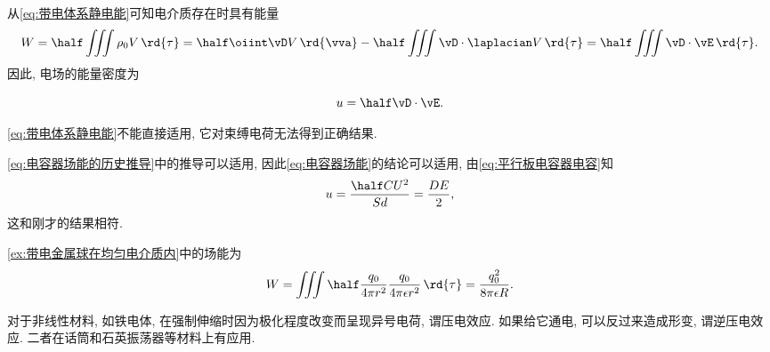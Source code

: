 \documentclass[../Electromagnetism.tex]{subfiles}
\begin{document}
从\eqref{eq:带电体系静电能}可知电介质存在时具有能量
\[ W = \half\iiint \rho_0 V\,\rd{\tau} = \half\oiint \vD V\,\rd{\vva} - \half \iiint \vD\cdot\laplacian V\,\rd{\tau} = \half\iiint \vD\cdot\vE \,\rd{\tau}. \]
因此, 电场的能量密度为
\begin{finale}
	\[ u = \half \vD\cdot\vE. \]
\end{finale}
\begin{pitfall}
	\eqref{eq:带电体系静电能}不能直接适用, 它对束缚电荷无法得到正确结果.
\end{pitfall}
\begin{ex}
	\eqref{eq:电容器场能的历史推导}中的推导可以适用, 因此\eqref{eq:电容器场能}的结论可以适用, 由\eqref{eq:平行板电容器电容}知
	\[ u = \frac{\half CU^2}{Sd} = \frac{DE}{2}, \]
	这和刚才的结果相符.
\end{ex}
\begin{ex}
	\cref{ex:带电金属球在均匀电介质内}中的场能为
	\[ W = \iiint \half \frac{q_0}{4\pi r^2}\frac{q_0}{4\pi \epsilon r^2} \,\rd{\tau} = \frac{q_0^2}{8\pi\epsilon R}. \]
\end{ex}
\begin{remark}
	对于非线性材料, 如铁电体, 在强制伸缩时因为极化程度改变而呈现异号电荷, 谓压电效应. 如果给它通电, 可以反过来造成形变, 谓逆压电效应. 二者在话筒和石英振荡器等材料上有应用.
\end{remark}



\end{document}
